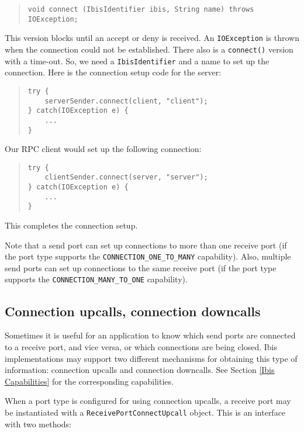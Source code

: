 \documentclass[10pt]{article}
\newcommand{\mysubsection}[1]{\subsection{#1}\label{#1}}
\begin{document}
{\small
\begin{quote}
\begin{verbatim}
void connect (IbisIdentifier ibis, String name) throws IOException;
\end{verbatim}
\end{quote}
}

\noindent
This version blocks until an accept or deny is received.
An \texttt{IOException} is thrown when the connection could not be established.
There also is a \texttt{connect()} version with a time-out.
So, we need a \texttt{IbisIdentifier} and a name to set up the
connection.
Here is the connection setup code for the server:

{\small
\begin{quote}
\begin{verbatim}
try {
    serverSender.connect(client, "client");
} catch(IOException e) {
    ...
}
\end{verbatim}
\end{quote}
}

\noindent
Our RPC client would set up the following connection:

{\small
\begin{quote}
\begin{verbatim}
try {
    clientSender.connect(server, "server");
} catch(IOException e) {
    ...
}
\end{verbatim}
\end{quote}
}

This completes the connection setup.

Note that a send port can set up connections to more than one
receive port (if the port type supports the \texttt{CONNECTION\_ONE\_TO\_MANY}
capability). Also, multiple send ports can set up
connections to the same receive port (if the port type supports
the \texttt{CONNECTION\_MANY\_TO\_ONE} capability).

\mysubsection{Connection upcalls, connection downcalls}

Sometimes it is useful for an application to know which send ports
are connected to a receive port, and vice versa, or which connections
are being closed.
Ibis implementations may support two different mechanisms for obtaining
this type of information: connection upcalls and connection downcalls.
See Section \ref{Ibis Capabilities} for the corresponding capabilities.

When a port type is configured for using connection upcalls,
a receive port may be instantiated with a \texttt{ReceivePortConnectUpcall}
object. This is an interface with two methods:
\end{document}
